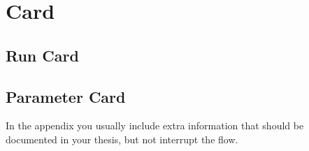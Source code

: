 \chapter{Card}

\section{Run Card }


\section{Parameter Card }


In the appendix you usually include extra information that should be
documented in your thesis, but not interrupt the flow.

